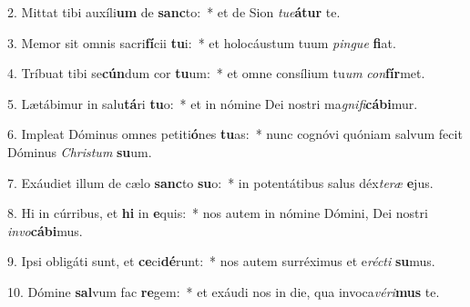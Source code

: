 2. Mittat tibi auxíli\textbf{um} de \textbf{sanc}to:~*  et de Sion \textit{tu}\textit{e}\textbf{á}\textbf{tur} te.\

3. Memor sit omnis sacri\textbf{fí}cii \textbf{tu}i:~*  et holocáustum tuum \textit{pin}\textit{gue} \textbf{fi}at.\

4. Tríbuat tibi se\textbf{cún}dum cor \textbf{tu}um:~*  et omne consílium tu\textit{um} \textit{con}\textbf{fír}met.\

5. Lætábimur in salu\textbf{tá}ri \textbf{tu}o:~*  et in nómine Dei nostri ma\textit{gni}\textit{fi}\textbf{cá}\textbf{bi}mur.\

6. Impleat Dóminus omnes petiti\textbf{ó}nes \textbf{tu}as:~*  nunc cognóvi quóniam salvum fecit Dóminus \textit{Chris}\textit{tum} \textbf{su}um.\

7. Exáudiet illum de cælo \textbf{sanc}to \textbf{su}o:~*  in potentátibus salus déx\textit{te}\textit{ræ} \textbf{e}jus.\

8. Hi in cúrribus, et \textbf{hi} in \textbf{e}quis:~*  nos autem in nómine Dómini, Dei nostri \textit{in}\textit{vo}\textbf{cá}\textbf{bi}mus.\

9. Ipsi obligáti sunt, et \textbf{ce}ci\textbf{dé}runt:~*  nos autem surréximus et e\textit{réc}\textit{ti} \textbf{su}mus.\

10. Dómine \textbf{sal}vum fac \textbf{re}gem:~*  et exáudi nos in die, qua invoca\textit{vé}\textit{ri}\textbf{mus} te.\

